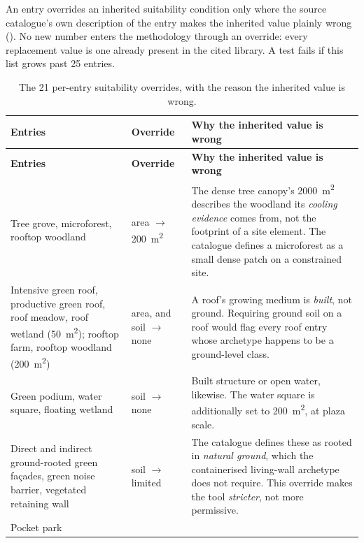 An entry overrides an inherited suitability condition only where the source
catalogue's own description of the entry makes the inherited value plainly
wrong (). No new number enters the methodology through an
override: every replacement value is one already present in the cited library.
A test fails if this list grows past \num{25} entries.

\begin{longtable}{@{}>{\raggedright\arraybackslash}p{52mm}
                    >{\raggedright\arraybackslash}p{26mm}
                    >{\raggedright\arraybackslash}p{50mm}@{}}
\caption[Per-entry suitability overrides]{The \num{21} per-entry suitability
overrides, with the reason the inherited value is wrong.}
\label{tab:app-overrides}\\
\toprule
\textbf{Entries} & \textbf{Override} & \textbf{Why the inherited value is
wrong} \\
\midrule
\endfirsthead
\toprule
\textbf{Entries} & \textbf{Override} & \textbf{Why the inherited value is
wrong} \\
\midrule
\endhead
\bottomrule
\endlastfoot
Tree grove, microforest, rooftop woodland &
area $\rightarrow$ \qty{200}{\metre\squared} &
The dense tree canopy's \qty{2000}{\metre\squared} describes the woodland its
\emph{cooling evidence} comes from, not the footprint of a site element. The
catalogue defines a microforest as a small dense patch on a constrained
site. \\
\addlinespace
Intensive green roof, productive green roof, roof meadow, roof wetland
(\qty{50}{\metre\squared}); rooftop farm, rooftop woodland
(\qty{200}{\metre\squared}) &
area, and soil $\rightarrow$ none &
A roof's growing medium is \emph{built}, not ground. Requiring ground soil on a
roof would flag every roof entry whose archetype happens to be a ground-level
class. \\
\addlinespace
Green podium, water square, floating wetland &
soil $\rightarrow$ none &
Built structure or open water, likewise. The water square is additionally set
to \qty{200}{\metre\squared}, at plaza scale. \\
\addlinespace
Direct and indirect ground-rooted green fa\c{c}ades, green noise barrier,
vegetated retaining wall &
soil $\rightarrow$ limited &
The catalogue defines these as rooted in \emph{natural ground}, which the
containerised living-wall archetype does not require. This override makes the
tool \emph{stricter}, not more permissive. \\
\addlinespace
Pocket park &

\end{longtable}
